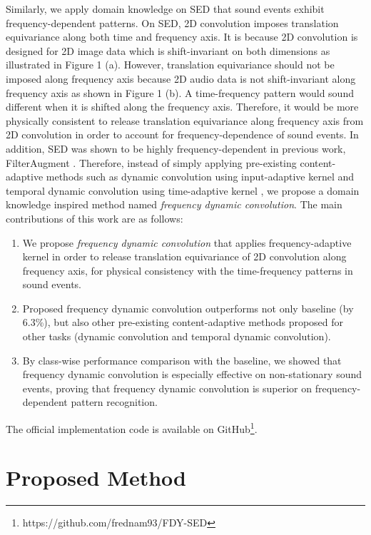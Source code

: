 \documentclass[a4paper]{article}
\begin{document}
Similarly, we apply domain knowledge on SED that sound events exhibit frequency-dependent patterns. On SED, 2D convolution imposes translation equivariance along both time and frequency axis. It is because 2D convolution is designed for 2D image data which is shift-invariant on both dimensions as illustrated in Figure 1 (a). However, translation equivariance should not be imposed along frequency axis because 2D audio data is not shift-invariant along frequency axis as shown in Figure 1 (b). A time-frequency pattern would sound different when it is shifted along the frequency axis. Therefore, it would be more physically consistent to release translation equivariance along frequency axis from 2D convolution in order to account for frequency-dependence of sound events. In addition, SED was shown to be highly frequency-dependent in previous work, FilterAugment \cite{filtaug}. Therefore, instead of simply applying pre-existing content-adaptive methods such as dynamic convolution using input-adaptive kernel \cite{dyconv} and temporal dynamic convolution using time-adaptive kernel \cite{tdycnn}, we propose a domain knowledge inspired method named \textit{frequency dynamic convolution}. The main contributions of this work are as follows:
\begin{enumerate}
\vspace{3pt}
    \itemsep0.3em
    \item{We propose \textit{frequency dynamic convolution} that applies frequency-adaptive kernel in order to release translation equivariance of 2D convolution along frequency axis, for physical consistency with the time-frequency patterns in sound events.}
    \item{Proposed frequency dynamic convolution outperforms not only baseline (by 6.3\%), but also other pre-existing content-adaptive methods proposed for other tasks (dynamic convolution and temporal dynamic convolution).}
    \item{By class-wise performance comparison with the baseline, we showed that frequency dynamic convolution is especially effective on non-stationary sound events, proving that frequency dynamic convolution is superior on frequency-dependent pattern recognition.}
\vspace{5pt}
\end{enumerate}
The official implementation code is available on GitHub\footnote{https://github.com/frednam93/FDY-SED}.
 
\vspace{5pt}
\section{Proposed Method}
\vspace{5pt}
\end{document}
